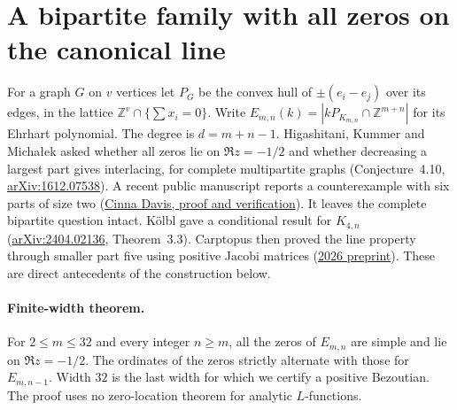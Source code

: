 \section{A bipartite family with all zeros on the canonical line}\label{sec:ehrhart}
For a graph $G$ on $v$ vertices let $P_G$ be the convex hull of
$\pm(e_i-e_j)$ over its edges, in the lattice $\mathbb Z^v\cap\{\sum x_i=0\}$.
Write $E_{m,n}(k)=|kP_{K_{m,n}}\cap\mathbb Z^{m+n}|$ for its Ehrhart polynomial.
The degree is $d=m+n-1$. Higashitani, Kummer and Michałek asked whether all zeros lie
on $\Re z=-1/2$ and whether decreasing a largest part gives interlacing, for
complete multipartite graphs (Conjecture~4.10, \href{https://arxiv.org/abs/1612.07538}{arXiv:1612.07538}).
A recent public manuscript reports a counterexample with six parts of size two
(\href{https://itsdavis.com/solved-conjectures/results/hkm-ehrhart/}{Cinna Davis, proof and verification}).
It leaves the complete bipartite question intact. Kölbl gave a conditional
result for $K_{4,n}$ (\href{https://arxiv.org/abs/2404.02136}{arXiv:2404.02136}, Theorem~3.3).
Carptopus then proved the line property through smaller part five using positive Jacobi
matrices (\href{https://doi.org/10.5281/zenodo.22486582}{2026 preprint}).
These are direct antecedents of the construction below.

\paragraph{Finite-width theorem.}
For $2\le m\le 32$ and every integer $n\ge m$, all the zeros of $E_{m,n}$
are simple and lie on $\Re z=-1/2$. The ordinates of the zeros strictly alternate with
those for $E_{m,n-1}$. Width $32$ is the last width for which we certify a positive Bezoutian.
The proof uses no zero-location theorem for analytic $L$-functions.

